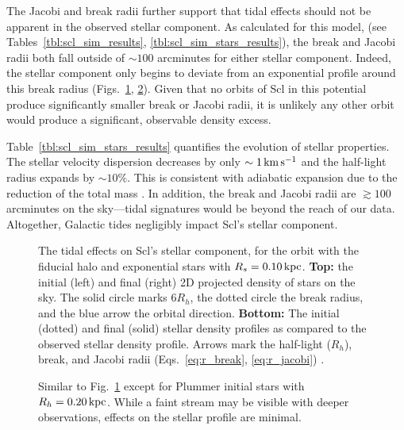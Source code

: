 The Jacobi and break radii further support that tidal effects should not
be apparent in the observed stellar component. As calculated for this
model, (see
Tables~\ref{tbl:scl_sim_results}, \ref{tbl:scl_sim_stars_results}), the
break and Jacobi radii both fall outside of \(\sim 100\) arcminutes for
either stellar component. Indeed, the stellar component only begins to
deviate from an exponential profile around this break radius
(Figs.~\ref{fig:scl_smallperi_i_f}, \ref{fig:scl_smallperi_plummer_i_f}).
Given that no orbits of Scl in this potential produce significantly
smaller break or Jacobi radii, it is unlikely any other orbit would
produce a significant, observable density excess.

Table~\ref{tbl:scl_sim_stars_results} quantifies the evolution of
stellar properties. The stellar velocity dispersion decreases by only
\(\sim1\,{\rm km\,s^{-1}}\) and the half-light radius expands by \(\sim 10\%\). This
is consistent with adiabatic expansion due to the reduction of the total
mass \citep[e.g.,][]{stucker+2023}. In addition, the break and Jacobi
radii are \(\gtrsim 100\) arcminutes on the sky---tidal signatures would
be beyond the reach of our data. Altogether, Galactic tides negligibly
impact Scl's stellar component.

\begin{figure}
\centering
{}
\caption[Sculptor initial and final density profiles]{The tidal effects
on Scl's stellar component, for the \smallperi{} orbit with the fiducial
halo and exponential stars with \(R_s=0.10\,{\rm kpc}\). \textbf{Top:} the
initial (left) and final (right) 2D projected density of stars on the
sky. The solid circle marks \(6R_h\), the dotted circle the break
radius, and the blue arrow the orbital direction. \textbf{Bottom:} The
initial (dotted) and final (solid) stellar density profiles as compared
to the observed stellar density profile. Arrows mark the half-light
(\(R_h\)), break, and Jacobi radii
(Eqs.~\ref{eq:r_break}, \ref{eq:r_jacobi})
.}\label{fig:scl_smallperi_i_f}
\end{figure}

\begin{figure}
\centering
{}
\caption[Sculptor Plummer initial and final density profiles]{Similar to
Fig.~\ref{fig:scl_smallperi_i_f} except for Plummer initial stars with
\(R_h = 0.20\,{\rm kpc}\). While a faint stream may be visible with deeper
observations, effects on the stellar profile are
minimal.}\label{fig:scl_smallperi_plummer_i_f}
\end{figure}

